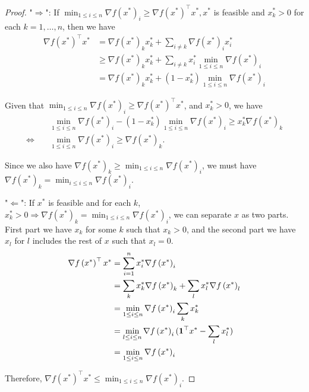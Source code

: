 \documentclass[11pt]{article}
\begin{document}
\begin{proof}
"$\Rightarrow$": 
If $\min_{1 \leq i \leq n} \nabla f\left(x^*\right)_i \geq \nabla f\left(x^*\right)^{\top} x^*, x^*$ is feasible and $x_k^*>0$ for each $k = 1, \dots, n$, then we have
$$
\begin{aligned}
\nabla f\left(x^*\right)^{\top} x^* & =\nabla f\left(x^*\right)_k  x_k^*+\sum_{i \neq k} \nabla f\left(x^*\right)_i x_i^* \\
& \geq \nabla f\left(x^*\right)_k  x_k^*+\sum_{i \neq k} x_i^*  \min _{1 \leq i \leq n} \nabla f\left(x^*\right)_i \\
& =\nabla f\left(x^*\right)_k  x_k^*+\left(1-x_k^*\right) \min _{1 \leq i \leq n} \nabla f\left(x^*\right)_i
\end{aligned}
$$


Given that $\min_{1 \leq i \leq n} \nabla f\left(x^*\right)_i \geq \nabla f\left(x^*\right)^{\top} x^*$, and $x_k^*>0$, we have
$$
\begin{aligned}
& \min _{1 \leq i \leq n} \nabla f\left(x^*\right)_i-\left(1-x_k^*\right)\min_{1 \leq i \leq n} \nabla f\left(x^*\right)_i \geq x_k^* \nabla f\left(x^*\right)_k \\
\Leftrightarrow \quad
& \min _{1 \leq i \leq n} \nabla f\left(x^*\right)_i \geq \nabla f\left(x^*\right)_k .
\end{aligned}
$$


Since we also have $\nabla f\left(x^*\right)_k \geq \min _{1 \leq i \leq n} \nabla f\left(x^*\right)_i$, we must have $\nabla f\left(x^*\right)_k=\min _{i \leq i \leq n} \nabla f\left(x^*\right)_i$.


"$\Leftarrow$":
If $x^*$ is feasible and for each $k$, $x_k^*>0 \Rightarrow \nabla f\left(x^*\right)_k=\min _{1\leq  i \leq n} \nabla f\left(x^*\right)_i$, we can separate $x$ as two parts. First part we have $x_k$ for some $k$ such that $x_k > 0$, and the second part we have $x_l$ for $l$ includes the rest of $x$ such that $x_l = 0$.
$$
\begin{aligned}
\nabla f\left(x^*\right)^{\top} x^* & =\sum_{i=1}^n x_i^* \nabla f\left(x^*\right)_i \\
& =\sum_{k} x_k^* \nabla f\left(x^*\right)_k+\sum_{l} x_l^* \nabla f\left(x^*\right)_l \\
& =\min _{1 \leq i \leq n} \nabla f\left(x^*\right)_i \sum_{k} x_k^* \\
& =\min _{l \leq i \leq n} \nabla f\left(x^*\right)_i(\mathbf 1^{\top} x^*-\sum_{l} x_l^*) \\
& =\min _{1 \leq i \leq n} \nabla f\left(x^*\right)_i
\end{aligned}
$$


Therefore, $\nabla f\left(x^*\right)^{\top} x^* \leq \min _{1\leq i \leq n} \nabla f\left(x^*\right)_i$.
\end{proof}
\end{document}
